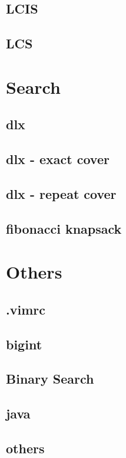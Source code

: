 \documentclass[a4paper,5pt,twocolumn,titlepage]{article}
\begin{document}
\subsection{LCIS}

\subsection{LCS}


\section{Search}
\subsection{dlx}

\subsection{dlx - exact cover}

\subsection{dlx - repeat cover}

\subsection{fibonacci knapsack}


\section{Others}
\subsection{.vimrc}

\subsection{bigint}

\subsection{Binary Search}

\subsection{java}

\subsection{others}

\end{document}
